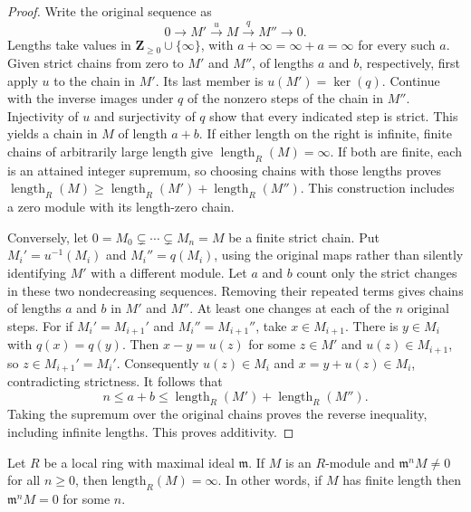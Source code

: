 \begin{proof}
Write the original sequence as
$$
0\longrightarrow M'\xrightarrow{u}M\xrightarrow{q}M''
\longrightarrow0.
$$
Lengths take values in $\mathbf Z_{\geq0}\cup\{\infty\}$,
with $a+\infty=\infty+a=\infty$ for every such $a$.
Given strict chains from zero to $M'$ and $M''$, of lengths
$a$ and $b$, respectively, first apply $u$ to the chain in
$M'$. Its last member is $u(M')=\ker(q)$.
Continue with the inverse images under $q$ of the nonzero steps
of the chain in $M''$. Injectivity of $u$ and surjectivity of
$q$ show that every indicated step is strict. This yields a
chain in $M$ of length $a+b$. If either length on the right is
infinite, finite chains of arbitrarily large length give
$\operatorname{length}_R(M)=\infty$. If both are finite, each
is an attained integer supremum, so choosing chains with those
lengths proves
$\operatorname{length}_R(M)\geq
\operatorname{length}_R(M')+\operatorname{length}_R(M'')$.
This construction includes a zero module with its length-zero chain.

Conversely, let $0=M_0\subsetneq\cdots\subsetneq M_n=M$
be a finite strict chain. Put
$M_i'=u^{-1}(M_i)$ and $M_i''=q(M_i)$, using the original
maps rather than silently identifying $M'$ with a different module.
Let $a$ and $b$ count only the strict changes in these two
nondecreasing sequences. Removing their repeated terms gives
chains of lengths $a$ and $b$ in $M'$ and $M''$.
At least one changes at each of the $n$ original steps.
For if $M_i'=M_{i+1}'$ and $M_i''=M_{i+1}''$, take
$x\in M_{i+1}$. There is $y\in M_i$ with $q(x)=q(y)$.
Then $x-y=u(z)$ for some $z\in M'$ and
$u(z)\in M_{i+1}$, so $z\in M_{i+1}'=M_i'$.
Consequently $u(z)\in M_i$ and $x=y+u(z)\in M_i$,
contradicting strictness. It follows that
$$
n\leq a+b\leq
\operatorname{length}_R(M')+\operatorname{length}_R(M'').
$$
Taking the supremum over the original chains proves the reverse
inequality, including infinite lengths. This proves additivity.
\end{proof}

\begin{lemma}
\label{editorial-source-lemma-length-infinite}
Let $R$ be a local ring with maximal ideal $\mathfrak m$.
If $M$ is an $R$-module and $\mathfrak m^n M \not = 0$ for all $n \geq 0$,
then $\text{length}_R(M) = \infty$. In other words, if $M$
has finite length then $\mathfrak m^nM = 0$ for some $n$.
\end{lemma}

